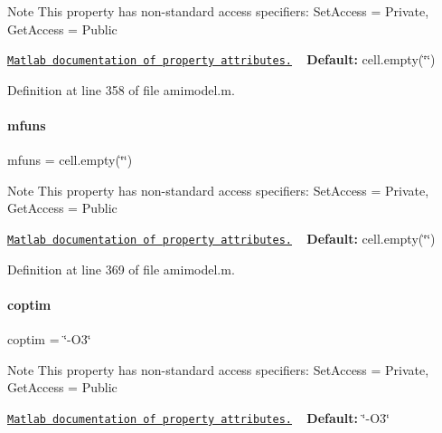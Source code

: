\begin{DoxyNote}{Note}
This property has non-\/standard access specifiers\+: {\ttfamily Set\+Access = Private, Get\+Access = Public} 

\href{http://www.mathworks.com/help/matlab/matlab_oop/property-attributes.html}{\tt Matlab documentation of property attributes.} ~\newline
{\bfseries Default\+:} cell.\+empty(\char`\"{}\char`\"{}) 
\end{DoxyNote}


Definition at line 358 of file amimodel.\+m.

\mbox{\label{classamimodel_a05ea829e5f102fa401df811ba1614ffb}} 
\paragraph{\texorpdfstring{mfuns}{mfuns}}
{\footnotesize\ttfamily mfuns = cell.\+empty(\char`\"{}\char`\"{})}

\begin{DoxyNote}{Note}
This property has non-\/standard access specifiers\+: {\ttfamily Set\+Access = Private, Get\+Access = Public} 

\href{http://www.mathworks.com/help/matlab/matlab_oop/property-attributes.html}{\tt Matlab documentation of property attributes.} ~\newline
{\bfseries Default\+:} cell.\+empty(\char`\"{}\char`\"{}) 
\end{DoxyNote}


Definition at line 369 of file amimodel.\+m.

\mbox{\label{classamimodel_ad99abcd270ac97546c46292ebc6c2e0a}} 
\paragraph{\texorpdfstring{coptim}{coptim}}
{\footnotesize\ttfamily coptim = \char`\"{}-\/O3\char`\"{}}

\begin{DoxyNote}{Note}
This property has non-\/standard access specifiers\+: {\ttfamily Set\+Access = Private, Get\+Access = Public} 

\href{http://www.mathworks.com/help/matlab/matlab_oop/property-attributes.html}{\tt Matlab documentation of property attributes.} ~\newline
{\bfseries Default\+:} \char`\"{}-\/\+O3\char`\"{} 
\end{DoxyNote}


